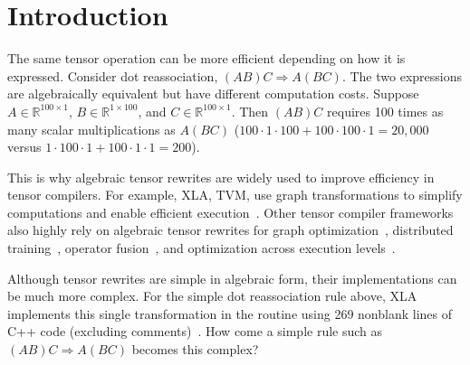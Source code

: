 \section{Introduction}
\label{sec:introduction}
The same tensor operation can be more efficient depending on how it is expressed.
Consider dot reassociation, $(AB)C \Rightarrow A(BC)$. The two expressions are
algebraically equivalent but have different computation costs. Suppose
$A\in\mathbb R^{100\times1}$, $B\in\mathbb R^{1\times100}$, and
$C\in\mathbb R^{100\times1}$.
Then $(AB)C$ requires 100 times as many scalar multiplications as $A(BC)$
($100\cdot1\cdot100+100\cdot100\cdot1=20{,}000$ versus
$1\cdot100\cdot1+100\cdot1\cdot1=200$).

This is why algebraic tensor rewrites are widely used to improve efficiency in tensor
compilers. For example, XLA, TVM, use graph transformations
to simplify computations and enable efficient execution~\cite{xla-hlo-passes,tvm}.
Other tensor compiler frameworks also highly rely on algebraic tensor rewrites for
graph optimization~\cite{taso,tensat,spores,pytorch2}, distributed
training~\cite{unity}, operator fusion~\cite{dnnfusion,neptune},
and optimization across execution levels~\cite{mirage,trinity}.


Although tensor rewrites are simple in algebraic form, their implementations
can be much more complex. For the simple dot reassociation rule above, XLA
implements this single transformation in the
 routine using 269 nonblank lines of C++
code (excluding comments)~\cite{xla-simplifier}.
How come a simple rule such as $(AB)C \Rightarrow A(BC)$ becomes this complex?

